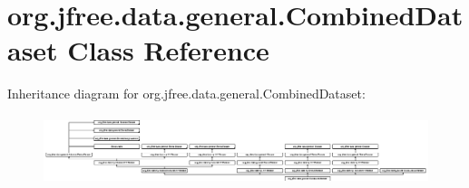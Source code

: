 \hypertarget{classorg_1_1jfree_1_1data_1_1general_1_1_combined_dataset}{}\section{org.\+jfree.\+data.\+general.\+Combined\+Dataset Class Reference}
\label{classorg_1_1jfree_1_1data_1_1general_1_1_combined_dataset}
Inheritance diagram for org.\+jfree.\+data.\+general.\+Combined\+Dataset\+:\begin{figure}[H]
\begin{center}
\leavevmode
\includegraphics[height=2.051282cm]{classorg_1_1jfree_1_1data_1_1general_1_1_combined_dataset}
\end{center}
\end{figure}
